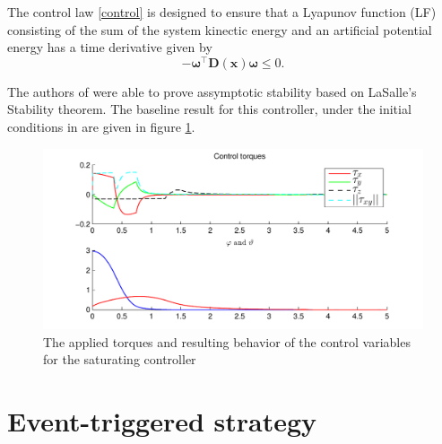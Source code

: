 \documentclass{article}
\begin{document}
		The control law \eqref{control} is designed to ensure that a Lyapunov function (LF) consisting of the sum of the system kinectic energy and an artificial potential energy has a time derivative given by
		\begin{equation}
			-\boldsymbol \omega^\top \mathbf{D(x)} \boldsymbol \omega \leq 0.
			\label{control2}
		\end{equation}
		
		The authors of \cite{lohmann_attitude} were able to prove assymptotic stability based on LaSalle's Stability theorem. The baseline result for this controller, under the initial conditions in \cite{lohmann_attitude} are given in figure \ref{baseline}.
		\begin{figure}
			\centering
			\includegraphics[width=\textwidth]{baseline}
			\caption{The applied torques and resulting behavior of the control variables for the saturating controller \cite{lohmann_attitude}\label{baseline}}
		\end{figure}
		
	\section{Event-triggered strategy}
		
\end{document}
